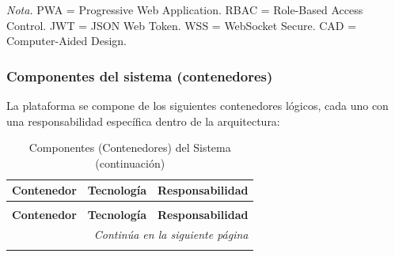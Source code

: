 \textit{Nota.} PWA = Progressive Web Application. RBAC = Role-Based Access Control. JWT = JSON Web Token. WSS = WebSocket Secure. CAD = Computer-Aided Design.

\subsubsection{Componentes del sistema (contenedores)}

La plataforma se compone de los siguientes contenedores lógicos, cada uno con una responsabilidad específica dentro de la arquitectura:

\begin{longtable}{p{3cm} p{2.8cm} p{8cm}}
\caption{Componentes (Contenedores) del Sistema} \\
\toprule
\textbf{Contenedor} & \textbf{Tecnología} & \textbf{Responsabilidad} \\
\midrule
\endfirsthead

\caption[]{Componentes (Contenedores) del Sistema (continuación)} \\
\toprule
\textbf{Contenedor} & \textbf{Tecnología} & \textbf{Responsabilidad} \\
\midrule
\endhead

\midrule
\multicolumn{3}{r}{\footnotesize\textit{Continúa en la siguiente página}} \\
\endfoot

\bottomrule
\endlastfoot


\end{longtable}

